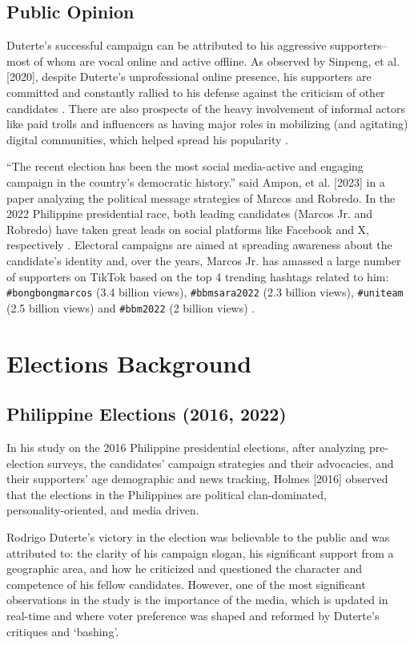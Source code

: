 \subsection{Public Opinion}
Duterte’s successful campaign can be attributed to his aggressive supporters– most of whom are vocal online and active offline. As observed by Sinpeng, et al. [2020], despite Duterte’s unprofessional online presence, his supporters are committed and constantly rallied to his defense against the criticism of other candidates \cite{RRL_Sinpeng-2020}. There are also prospects of the heavy involvement of informal actors like paid trolls and influencers as having major roles in mobilizing (and agitating) digital communities, which helped spread his popularity \cite{RRL_Sinpeng-2020}.

“The recent election has been the most social media-active and engaging campaign in the country’s democratic history.” said Ampon, et al. [2023] in a paper analyzing the political message strategies of Marcos and Robredo.  In the 2022 Philippine presidential race, both leading candidates (Marcos Jr. and Robredo) have taken great leads on social platforms like Facebook and X, respectively \cite{RRL_Ampon-2023}. Electoral campaigns are aimed at spreading awareness about the candidate’s identity and, over the years, Marcos Jr. has amassed a large number of supporters on TikTok based on the top 4 trending hashtags related to him: \texttt{\#bongbongmarcos} (3.4 billion views), \texttt{\#bbmsara2022} (2.3 billion views), \texttt{\#uniteam} (2.5 billion views) and \texttt{\#bbm2022} (2 billion views) \cite{RRL_Mendoza-2022}.

\section{Elections Background}
\subsection{Philippine Elections (2016, 2022)}
In his study on the 2016 Philippine presidential elections, after analyzing pre-election surveys, the candidates' campaign strategies and their advocacies, and their supporters' age demographic and news tracking, Holmes [2016] observed that the elections in the Philippines are political clan-dominated, \\personality-oriented, and media driven\cite{RRL_Holmes-2016}.

Rodrigo Duterte's victory in the election was believable to the public and was attributed to: the clarity of his campaign slogan, his significant support from a geographic area, and how he criticized and questioned the character and competence of his fellow candidates. However, one of the most significant observations in the study is the importance of the media, which is updated in real-time and where voter preference was shaped and reformed by Duterte’s critiques and ‘bashing’\cite{RRL_Holmes-2016}.

